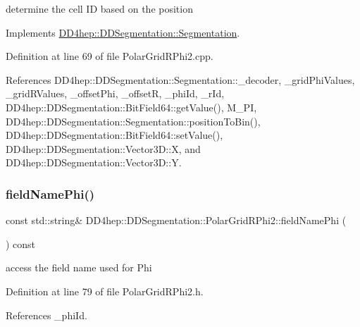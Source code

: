determine the cell ID based on the position 



Implements \hyperlink{class_d_d4hep_1_1_d_d_segmentation_1_1_segmentation_ad5a60953d96d409850d8192f64f8ce3c}{D\+D4hep\+::\+D\+D\+Segmentation\+::\+Segmentation}.



Definition at line 69 of file Polar\+Grid\+R\+Phi2.\+cpp.



References D\+D4hep\+::\+D\+D\+Segmentation\+::\+Segmentation\+::\+\_\+decoder, \+\_\+grid\+Phi\+Values, \+\_\+grid\+R\+Values, \+\_\+offset\+Phi, \+\_\+offsetR, \+\_\+phi\+Id, \+\_\+r\+Id, D\+D4hep\+::\+D\+D\+Segmentation\+::\+Bit\+Field64\+::get\+Value(), M\+\_\+\+PI, D\+D4hep\+::\+D\+D\+Segmentation\+::\+Segmentation\+::position\+To\+Bin(), D\+D4hep\+::\+D\+D\+Segmentation\+::\+Bit\+Field64\+::set\+Value(), D\+D4hep\+::\+D\+D\+Segmentation\+::\+Vector3\+D\+::X, and D\+D4hep\+::\+D\+D\+Segmentation\+::\+Vector3\+D\+::Y.

\hypertarget{class_d_d4hep_1_1_d_d_segmentation_1_1_polar_grid_r_phi2_ab8658c10a02490a6ab04ed4a7404d44b}{}\label{class_d_d4hep_1_1_d_d_segmentation_1_1_polar_grid_r_phi2_ab8658c10a02490a6ab04ed4a7404d44b} 
\subsubsection{\texorpdfstring{field\+Name\+Phi()}{fieldNamePhi()}}
{\footnotesize\ttfamily const std\+::string\& D\+D4hep\+::\+D\+D\+Segmentation\+::\+Polar\+Grid\+R\+Phi2\+::field\+Name\+Phi (\begin{DoxyParamCaption}{ }\end{DoxyParamCaption}) const\hspace{0.3cm}{\ttfamily [inline]}}



access the field name used for Phi 



Definition at line 79 of file Polar\+Grid\+R\+Phi2.\+h.



References \+\_\+phi\+Id.

\hypertarget{class_d_d4hep_1_1_d_d_segmentation_1_1_polar_grid_r_phi2_a3a7168aee4b9f951dfb018cb1b75905f}{}\label{class_d_d4hep_1_1_d_d_segmentation_1_1_polar_grid_r_phi2_a3a7168aee4b9f951dfb018cb1b75905f} 

